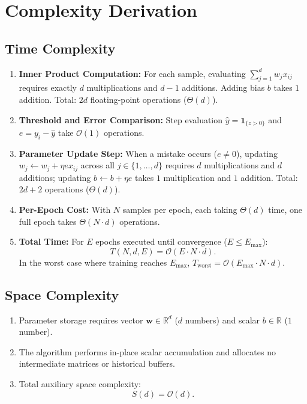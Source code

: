 \documentclass[11pt]{article}
\begin{document}
\section{Complexity Derivation}
\label{sec:complexity}

\subsection{Time Complexity}
\begin{enumerate}
    \item \textbf{Inner Product Computation:} For each sample, evaluating $\sum_{j=1}^d w_j x_{ij}$ requires exactly $d$ multiplications and $d-1$ additions. Adding bias $b$ takes $1$ addition. Total: $2d$ floating-point operations ($\Theta(d)$).
    \item \textbf{Threshold and Error Comparison:} Step evaluation $\hat{y} = \mathbf{1}_{\{z > 0\}}$ and $e = y_i - \hat{y}$ take $\mathcal{O}(1)$ operations.
    \item \textbf{Parameter Update Step:} When a mistake occurs ($e \ne 0$), updating $w_j \leftarrow w_j + \eta e x_{ij}$ across all $j \in \{1, \dots, d\}$ requires $d$ multiplications and $d$ additions; updating $b \leftarrow b + \eta e$ takes $1$ multiplication and $1$ addition. Total: $2d + 2$ operations ($\Theta(d)$).
    \item \textbf{Per-Epoch Cost:} With $N$ samples per epoch, each taking $\Theta(d)$ time, one full epoch takes $\Theta(N \cdot d)$ operations.
    \item \textbf{Total Time:} For $E$ epochs executed until convergence ($E \le E_{\max}$):
    \begin{equation}
    T(N, d, E) = \mathcal{O}(E \cdot N \cdot d).
    \end{equation}
    In the worst case where training reaches $E_{\max}$, $T_{\text{worst}} = \mathcal{O}(E_{\max} \cdot N \cdot d)$.
\end{enumerate}

\subsection{Space Complexity}
\begin{enumerate}
    \item Parameter storage requires vector $\mathbf{w} \in \mathbb{R}^d$ ($d$ numbers) and scalar $b \in \mathbb{R}$ ($1$ number).
    \item The algorithm performs in-place scalar accumulation and allocates no intermediate matrices or historical buffers.
    \item Total auxiliary space complexity:
    \begin{equation}
    S(d) = \mathcal{O}(d).
    \end{equation}
\end{enumerate}
\end{document}
